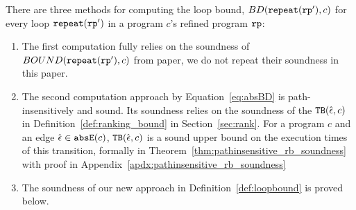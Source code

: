 
There are three methods for computing the loop bound, $BD(\mathtt{repeat}(\mathtt{rp}'), c)$ for every loop $\mathtt{repeat}(\mathtt{rp}')$ in a program $c$'s refined program $\mathtt{rp}$:
\begin{enumerate}
  \item The first computation fully relies on the soundness of $BOUND(\mathtt{repeat}(\mathtt{rp}'), c)$ from paper\cite{GulwaniJK09}, we do not repeat their soundness in this paper.
  \item The second computation approach by Equation~\ref{eq:absBD} is path-insensitively and sound.
    Its soundness relies on the soundness of the ${\mathtt{TB}}(\hat{\mathtt{\epsilon}{}}, c)$ in Definition~\ref{def:ranking_bound} in Section~\ref{sec:rank}.
    For a program $c$ and an edge $\hat{\mathtt{\epsilon}{}} \in \mathtt{abs}{\mathtt{E}}(c)$, ${\mathtt{TB}}(\hat{\mathtt{\epsilon}{}}, c)$ is a sound upper bound on the execution times of this transition, formally in Theorem~\ref{thm:pathinsensitive_rb_soundness} with proof in Appendix~\ref{apdx:pathinsensitive_rb_soundness}    
    \item  The soundness of our new approach in Definition~\ref{def:loopbound} is proved below.
  \end{enumerate}

